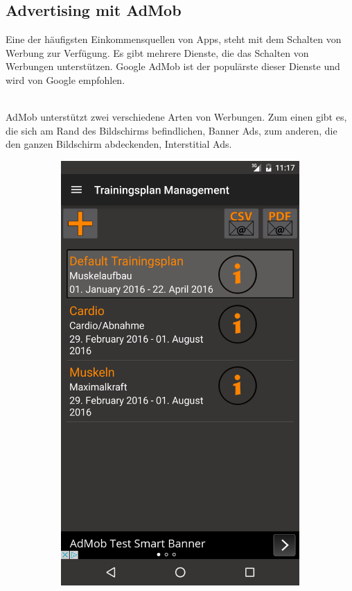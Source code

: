 \documentclass[FIPLY_base.tex]{subfiles}
\begin{document}
\subsection{Advertising mit AdMob}
Eine der häufigsten Einkommensquellen von Apps, steht mit dem Schalten von Werbung zur Verfügung.
Es gibt mehrere Dienste, die das Schalten von Werbungen unterstützen.
Google AdMob ist der populärste dieser Dienste und wird von Google empfohlen.

\ \\
AdMob unterstützt zwei verschiedene Arten von Werbungen. 
Zum einen gibt es, die sich am Rand des Bildschirms befindlichen, Banner Ads, zum anderen, die den ganzen Bildschirm abdeckenden, Interstitial Ads. 
\ \\
\begin{figure}[h]
	\begin{subfigure}[b]{0.3\textwidth}
	\includegraphics[scale=0.15]{img/adsBanner}

\end{subfigure}
\end{figure}
\end{document}
